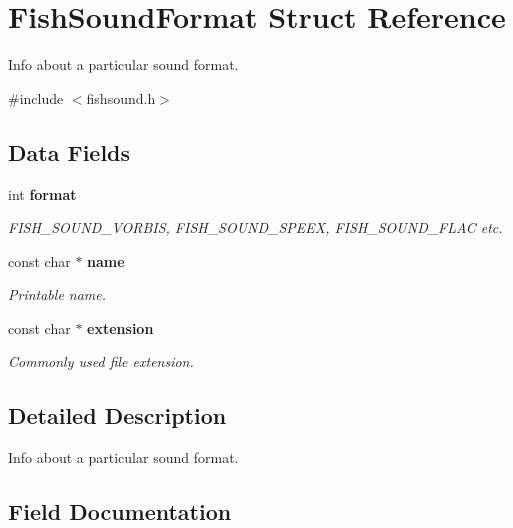 \section{\-Fish\-Sound\-Format \-Struct \-Reference}
\label{structFishSoundFormat}


\-Info about a particular sound format.  




{\ttfamily \#include $<$fishsound.\-h$>$}

\subsection*{\-Data \-Fields}
\begin{DoxyCompactItemize}
\item 
int {\bf format}
\begin{DoxyCompactList}\small\item\em \-F\-I\-S\-H\-\_\-\-S\-O\-U\-N\-D\-\_\-\-V\-O\-R\-B\-I\-S, \-F\-I\-S\-H\-\_\-\-S\-O\-U\-N\-D\-\_\-\-S\-P\-E\-E\-X, \-F\-I\-S\-H\-\_\-\-S\-O\-U\-N\-D\-\_\-\-F\-L\-A\-C etc. \end{DoxyCompactList}\item 
const char $\ast$ {\bf name}\label{structFishSoundFormat_acb3416e65b3622a229f5eb835edc1ac0}

\begin{DoxyCompactList}\small\item\em \-Printable name. \end{DoxyCompactList}\item 
const char $\ast$ {\bf extension}\label{structFishSoundFormat_ada9c478e59bad75dc2a0b4cb012534b9}

\begin{DoxyCompactList}\small\item\em \-Commonly used file extension. \end{DoxyCompactList}\end{DoxyCompactItemize}


\subsection{\-Detailed \-Description}
\-Info about a particular sound format. 

\subsection{\-Field \-Documentation}
